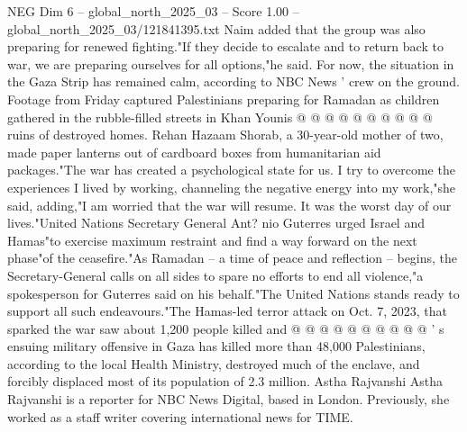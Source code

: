 \begin{textsample}{NEG Dim 6 – global\_north\_2025\_03 – Score 1.00 – global\_north\_2025\_03/121841395.txt}
Naim added that the group was also preparing for renewed fighting."If they decide to escalate and to return back to war, we are preparing ourselves for all options,"he said.
For now, the situation in the Gaza Strip has remained calm, according to NBC News ' crew on the ground.
Footage from Friday captured Palestinians preparing for Ramadan as children gathered in the rubble-filled streets in Khan Younis @ @ @ @ @ @ @ @ @ @ ruins of destroyed homes.
Rehan Hazaam Shorab, a 30-year-old mother of two, made paper lanterns out of cardboard boxes from humanitarian aid packages."The war has created a psychological state for us.
I try to overcome the experiences I lived by working, channeling the negative energy into my work,"she said, adding,"I am worried that the war will resume.
It was the worst day of our lives."United Nations Secretary General Ant? nio Guterres urged Israel and Hamas"to exercise maximum restraint and find a way forward on the next phase"of the ceasefire."As Ramadan -- a time of peace and reflection -- begins, the Secretary-General calls on all sides to spare no efforts to end all violence,"a spokesperson for Guterres said on his behalf."The United Nations stands ready to support all such endeavours."The Hamas-led terror attack on Oct. 7, 2023, that sparked the war saw about 1,200 people killed and @ @ @ @ @ @ @ @ @ @ ' s ensuing military offensive in Gaza has killed more than 48,000 Palestinians, according to the local Health Ministry, destroyed much of the enclave, and forcibly displaced most of its population of 2.3 million.
Astha Rajvanshi Astha Rajvanshi is a reporter for NBC News Digital, based in London.
Previously, she worked as a staff writer covering international news for TIME.

\end{textsample}
